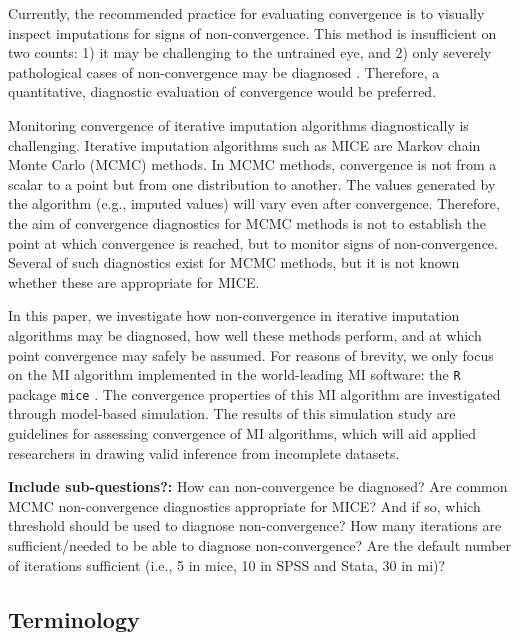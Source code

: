 \documentclass[Royal,times,sageh]{sagej}
\begin{document}
Currently, the recommended practice for evaluating convergence is to
visually inspect imputations for signs of non-convergence. This method
is insufficient on two counts: 1) it may be challenging to the untrained
eye, and 2) only severely pathological cases of non-convergence may be
diagnosed \citep[\(\S\) 6.5.2]{buur18}. Therefore, a quantitative,
diagnostic evaluation of convergence would be preferred.

Monitoring convergence of iterative imputation algorithms diagnostically
is challenging. Iterative imputation algorithms such as MICE are Markov
chain Monte Carlo (MCMC) methods. In MCMC methods, convergence is not
from a scalar to a point but from one distribution to another. The
values generated by the algorithm (e.g., imputed values) will vary even
after convergence. Therefore, the aim of convergence diagnostics for
MCMC methods is not to establish the point at which convergence is
reached, but to monitor signs of non-convergence. Several of such
diagnostics exist for MCMC methods, but it is not known whether these
are appropriate for MICE.

In this paper, we investigate how non-convergence in iterative
imputation algorithms may be diagnosed, how well these methods perform,
and at which point convergence may safely be assumed. For reasons of
brevity, we only focus on the MI algorithm implemented in the
world-leading MI software: the \texttt{R} \citep{R} package
\texttt{mice} \citep{mice}. The convergence properties of this MI
algorithm are investigated through model-based simulation. The results
of this simulation study are guidelines for assessing convergence of MI
algorithms, which will aid applied researchers in drawing valid
inference from incomplete datasets.

\textbf{Include sub-questions?:} How can non-convergence be diagnosed?
Are common MCMC non-convergence diagnostics appropriate for MICE? And if
so, which threshold should be used to diagnose non-convergence? How many
iterations are sufficient/needed to be able to diagnose non-convergence?
Are the default number of iterations sufficient (i.e., 5 in mice, 10 in
SPSS and Stata, 30 in mi)?

\hypertarget{terminology}{%
\subsection{Terminology}\label{terminology}}
\end{document}
